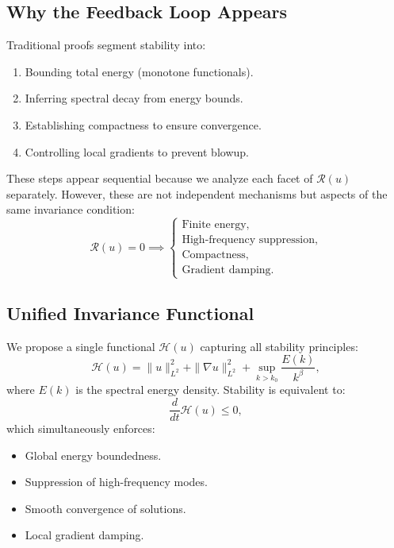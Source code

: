 \subsection{Why the Feedback Loop Appears}
Traditional proofs segment stability into:
\begin{enumerate}
    \item Bounding total energy (monotone functionals).
    \item Inferring spectral decay from energy bounds.
    \item Establishing compactness to ensure convergence.
    \item Controlling local gradients to prevent blowup.
\end{enumerate}
These steps appear sequential because we analyze each facet of \(\mathcal{R}(u)\) separately. However, these are not independent mechanisms but aspects of the same invariance condition:
\begin{equation}
\mathcal{R}(u) = 0 \implies \begin{cases}
\text{Finite energy,} \\
\text{High-frequency suppression,} \\
\text{Compactness,} \\
\text{Gradient damping.}
\end{cases}
\end{equation}

\subsection{Unified Invariance Functional}
We propose a single functional \(\mathcal{H}(u)\) capturing all stability principles:
\begin{equation}
\mathcal{H}(u) = \|u\|^2_{L^2} + \|\nabla u\|^2_{L^2} + \sup_{k > k_0} \frac{E(k)}{k^\beta},
\end{equation}
where \(E(k)\) is the spectral energy density. Stability is equivalent to:
\begin{equation}
\frac{d}{dt} \mathcal{H}(u) \leq 0,
\end{equation}
which simultaneously enforces:
\begin{itemize}
    \item Global energy boundedness.
    \item Suppression of high-frequency modes.
    \item Smooth convergence of solutions.
    \item Local gradient damping.
\end{itemize}

